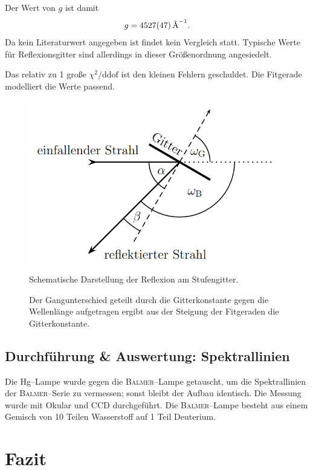 \documentclass[sn-mathphys-num,iicol]{sn-jnl}
\theoremstyle{thmstyleone}
\theoremstyle{thmstyletwo}
\theoremstyle{thmstylethree}
\begin{document}
Der Wert von $g$ ist damit
\begin{align} 
        g=\SI{4527+-47}{\text{\r{A}}^{-1}}
.\end{align} 
Da kein Literaturwert angegeben ist findet kein Vergleich statt.
Typische Werte für Reflexionsgitter sind allerdings in dieser Größenordnung angesiedelt.

Das relativ zu 1 große $\chi ^2/\text{ddof}$ ist den kleinen Fehlern geschuldet.
Die Fitgerade modelliert die Werte passend.

\begin{figure}[t]
        \centering
        \includegraphics[width=.5\textwidth]{402_reflexion.png}
        \caption{Schematische Darstellung der Reflexion am Stufengitter.\cite{Anleitung402}} \label{fig:strahlengang}
\end{figure}
\begin{figure}[t] 
        \centering
        \resizebox{.5\textwidth}{!}{}
        \caption{Der Gangunterschied geteilt durch die Gitterkonstante gegen die Wellenlänge aufgetragen ergibt aus der Steigung der Fitgeraden die Gitterkonstante.} \label{fig:gitterkonstante}
\end{figure}

\subsection{Durchführung \& Auswertung: Spektrallinien}
Die Hg--Lampe wurde gegen die \textsc{Balmer}--Lampe getauscht, um die Spektrallinien der \textsc{Balmer}--Serie zu vermessen; sonst bleibt der Aufbau identisch.
Die Messung wurde mit Okular und CCD durchgeführt.
Die \textsc{Balmer}--Lampe besteht aus einem Gemisch von 10 Teilen Wasserstoff auf 1 Teil Deuterium.

\section{Fazit}

\clearpage
\end{document}
